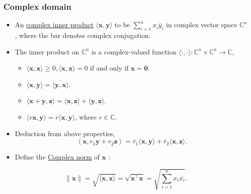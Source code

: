 \documentclass[12pt,thmsa]{article}
\begin{document}
\subsubsection{Complex domain}
\begin{itemize}
	\item An \underline{complex inner product} \(\langle\boldsymbol{x}, \boldsymbol{y}\rangle\) to be \(\sum_{i=1}^{n} x_{i} \bar{y}_{i}\) in complex vector space \(\mathbb{C}^{n}\), where the bar denotes complex conjugation. 
	
	\item The inner product on \(\mathbb{C}^{n}\) is a complex-valued function \(\langle\cdot, \cdot\rangle: \mathbb{C}^{n} \times \mathbb{C}^{n} \rightarrow \mathbb{C}\),
	
	\begin{itemize}
	\item \(\langle\boldsymbol{x}, \boldsymbol{x}\rangle \geq 0,\langle\boldsymbol{x}, \boldsymbol{x}\rangle=0\) if and only if \(\boldsymbol{x}=\mathbf{0}\). 
	
	\item \(\langle\boldsymbol{x}, \boldsymbol{y}\rangle=\overline{\langle\boldsymbol{y}, \boldsymbol{x}\rangle}\).
	
	\item \(\langle\boldsymbol{x}+\boldsymbol{y}, \boldsymbol{z}\rangle=\langle\boldsymbol{x}, \boldsymbol{z}\rangle+\langle\boldsymbol{y}, \boldsymbol{z}\rangle\).
	
	\item \(\langle r \boldsymbol{x}, \boldsymbol{y}\rangle=r\langle\boldsymbol{x}, \boldsymbol{y}\rangle\), where \(r \in \mathbb{C}\).
	\end{itemize}

	\item Deduction from above properties,
	\begin{equation*}
		\left\langle\boldsymbol{x}, r_{1} \boldsymbol{y}+r_{2} \boldsymbol{z}\right\rangle=\bar{r}_{1}\langle\boldsymbol{x}, \boldsymbol{y}\rangle+\bar{r}_{2}\langle\boldsymbol{x}, \boldsymbol{z}\rangle.
	\end{equation*}

	\item Define the \underline{Complex norm} of \(\boldsymbol{x}\) :

\end{itemize}

\begin{equation*}
\|\boldsymbol{x}\|=\sqrt{\langle\boldsymbol{x}, \boldsymbol{x}\rangle}=\sqrt{\boldsymbol{x}^{\top} \boldsymbol{x}}=\sqrt{\sum_{i=1}^{n} x_{i} \bar{x_{i}}}.
\end{equation*}
\end{document}
